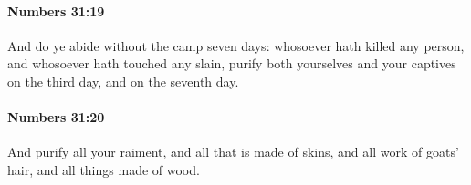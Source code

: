 		\paragraph{Numbers 31:19} %
			\label{NUMBERS-31-19}

			And do ye abide without the camp seven days: whosoever hath killed any person, and whosoever hath touched any slain, purify both yourselves and your captives on the third day, and on the seventh day.


		\paragraph{Numbers 31:20} %
			\label{NUMBERS-31-20}

			And purify all your raiment, and all that is made of skins, and all work of goats’ hair, and all things made of wood.


